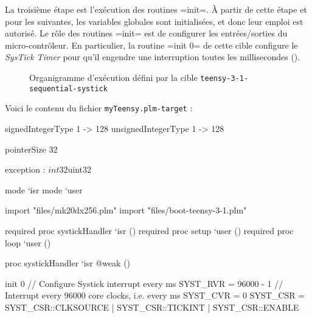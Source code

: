 La troisième étape est l'exécution des routines \plm=init=. À partir de cette étape et pour les suivantes, les variables globales sont initialisées, et donc leur emploi est autorisé. Le rôle des routines \plm=init= est de configurer les entrées/sorties du micro-contrôleur. En particulier, la routine \plm=init 0= de cette cible configure le \emph{SysTick Timer} pour qu'il engendre une interruption toutes les millisecondes ().


\begin{figure}[t]
  \centering
  \small
  \caption{Organigramme d'exécution défini par la cible \texttt{teensy-3-1-sequential-systick}}
  \ligne
\end{figure}











Voici le contenu du fichier \texttt{myTeensy.plm-target} :
\begin{PLM}[1]
signedIntegerType 1 -> 128
unsignedIntegerType 1 -> 128

pointerSize 32

exception : $int32 $uint32

mode `isr
mode `user

import "files/mk20dx256.plm"
import "files/boot-teensy-3-1.plm"

required proc systickHandler `isr ()
required proc setup `user ()
required proc loop `user ()

proc systickHandler `isr @weak () {
}

init 0 { // Configure Systick interrupt every ms
  SYST_RVR = 96000 - 1 // Interrupt every 96000 core clocks, i.e. every ms
  SYST_CVR = 0
  SYST_CSR = SYST_CSR::CLKSOURCE | SYST_CSR::TICKINT | SYST_CSR::ENABLE
}
\end{PLM}

